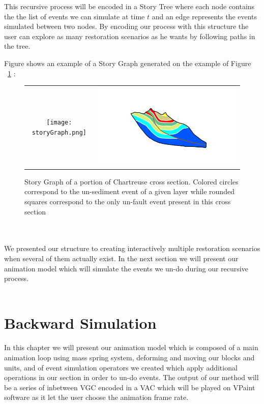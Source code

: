 \documentclass[12pt, a4paper]{report} %
\begin{document}
This recursive process will be encoded in a Story Tree where each node contains the the list of events we can simulate at time $t$ and an edge represents the events simulated between two nodes. By encoding our process with this structure the user can explore as many restoration scenarios as he wants by following paths in the tree.

Figure shows an example of a Story Graph generated on the example of Figure ~\ref{strorygraph} :

\begin{figure}[H]
\centering
\begin{tabular}{@{}cc@{}}
\texttt{[image: storyGraph.png]}&
\includegraphics[width=.95\textwidth]{chartreusedroite.png}\\
\end{tabular}
\caption{Story Graph of a portion of Chartreuse cross section. Colored circles correspond to the un-sediment event of a given layer while rounded squares correspond to the only un-fault event present in this cross section}
\label{strorygraph}
\end{figure}\\\\

We presented our structure to creating interactively multiple restoration scenarios when several of them actually exist. In the next section we will present our animation model which will simulate the events we un-do during our recursive process.\\\\

\chapter{Backward Simulation}
\label{ch:animationmodel}
In this chapter we will present our animation model which is composed of a main animation loop using mass spring system, deforming and moving our blocks and units, and of event simulation operators we created which apply additional operations in our section in order to un-do events. The output of our method will be a series of inbetween VGC encoded in a VAC which will be played on VPaint software \cite{vpaint} as it let the user choose the animation frame rate.\\\\
\end{document}
